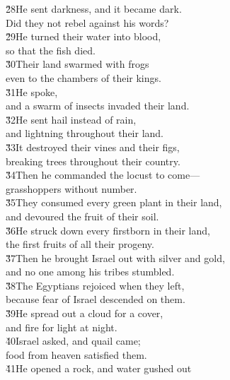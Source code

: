 \begin{poetry}
\poeml \v{28}He sent darkness, and it became dark. \\
\poemll    Did they not rebel against his words? \\
\poeml \v{29}He turned their water into blood, \\
\poemll    so that the fish died. \\
\poeml \v{30}Their land swarmed with frogs \\
\poemll    even to the chambers of their kings. \\
\poeml \v{31}He spoke, \\
\poemll    and a swarm of insects invaded their land. \\
\poeml \v{32}He sent hail instead of rain, \\
\poemll    and lightning throughout their land. \\
\poeml \v{33}It destroyed their vines and their figs, \\
\poemll    breaking trees throughout their country. \\
\poeml \v{34}Then he commanded the locust to come--- \\
\poemll    grasshoppers without number. \\
\poeml \v{35}They consumed every green plant in their land, \\
\poemll    and devoured the fruit of their soil. \\
\poeml \v{36}He struck down every firstborn in their land, \\
\poemll    the first fruits of all their progeny. \\
\poeml \v{37}Then he brought Israel out with silver and gold, \\
\poemll    and no one among his tribes stumbled. \\
\poeml \v{38}The Egyptians rejoiced when they left, \\
\poemll    because fear of Israel descended on them. \\
\poeml \v{39}He spread out a cloud for a cover, \\
\poemll    and fire for light at night. \\
\poeml \v{40}Israel asked, and quail came; \\
\poemll    food from heaven satisfied them. \\
\poeml \v{41}He opened a rock, and water gushed out \\

\end{poetry}
